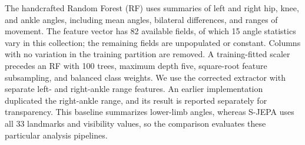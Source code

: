 The handcrafted Random Forest (RF) uses summaries of left and right hip, knee, and ankle angles, including mean angles, bilateral differences, and ranges of movement. The feature vector has 82 available fields, of which 15 angle statistics vary in this collection; the remaining fields are unpopulated or constant. Columns with no variation in the training partition are removed. A training-fitted scaler precedes an RF with 100 trees, maximum depth five, square-root feature subsampling, and balanced class weights. We use the corrected extractor with separate left- and right-ankle range features. An earlier implementation duplicated the right-ankle range, and its result is reported separately for transparency. This baseline summarizes lower-limb angles, whereas S-JEPA uses all 33 landmarks and visibility values, so the comparison evaluates these particular analysis pipelines.
